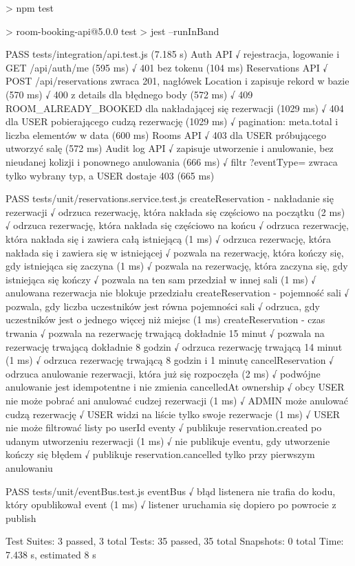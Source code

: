 \documentclass[12pt,a4paper]{article}
\begin{document}
\begin{terminal}
> npm test

> room-booking-api@5.0.0 test
> jest --runInBand

PASS tests/integration/api.test.js (7.185 s)
  Auth API
    √ rejestracja, logowanie i GET /api/auth/me (595 ms)
    √ 401 bez tokenu (104 ms)
  Reservations API
    √ POST /api/reservations zwraca 201, nagłówek Location i zapisuje rekord w bazie (570 ms)
    √ 400 z details dla błędnego body (572 ms)
    √ 409 ROOM_ALREADY_BOOKED dla nakładającej się rezerwacji (1029 ms)
    √ 404 dla USER pobierającego cudzą rezerwację (1029 ms)
    √ pagination: meta.total i liczba elementów w data (600 ms)
  Rooms API
    √ 403 dla USER próbującego utworzyć salę (572 ms)
  Audit log API
    √ zapisuje utworzenie i anulowanie, bez nieudanej kolizji i ponownego anulowania (666 ms)
    √ filtr ?eventType= zwraca tylko wybrany typ, a USER dostaje 403 (665 ms)

PASS tests/unit/reservations.service.test.js
  createReservation - nakładanie się rezerwacji
    √ odrzuca rezerwację, która nakłada się częściowo na początku (2 ms)
    √ odrzuca rezerwację, która nakłada się częściowo na końcu
    √ odrzuca rezerwację, która nakłada się i zawiera całą istniejącą (1 ms)
    √ odrzuca rezerwację, która nakłada się i zawiera się w istniejącej
    √ pozwala na rezerwację, która kończy się, gdy istniejąca się zaczyna (1 ms)
    √ pozwala na rezerwację, która zaczyna się, gdy istniejąca się kończy
    √ pozwala na ten sam przedział w innej sali (1 ms)
    √ anulowana rezerwacja nie blokuje przedziału
  createReservation - pojemność sali
    √ pozwala, gdy liczba uczestników jest równa pojemności sali
    √ odrzuca, gdy uczestników jest o jednego więcej niż miejsc (1 ms)
  createReservation - czas trwania
    √ pozwala na rezerwację trwającą dokładnie 15 minut
    √ pozwala na rezerwację trwającą dokładnie 8 godzin
    √ odrzuca rezerwację trwającą 14 minut (1 ms)
    √ odrzuca rezerwację trwającą 8 godzin i 1 minutę
  cancelReservation
    √ odrzuca anulowanie rezerwacji, która już się rozpoczęła (2 ms)
    √ podwójne anulowanie jest idempotentne i nie zmienia cancelledAt
  ownership
    √ obcy USER nie może pobrać ani anulować cudzej rezerwacji (1 ms)
    √ ADMIN może anulować cudzą rezerwację
    √ USER widzi na liście tylko swoje rezerwacje (1 ms)
    √ USER nie może filtrować listy po userId
  eventy
    √ publikuje reservation.created po udanym utworzeniu rezerwacji (1 ms)
    √ nie publikuje eventu, gdy utworzenie kończy się błędem
    √ publikuje reservation.cancelled tylko przy pierwszym anulowaniu

PASS tests/unit/eventBus.test.js
  eventBus
    √ błąd listenera nie trafia do kodu, który opublikował event (1 ms)
    √ listener uruchamia się dopiero po powrocie z publish

Test Suites: 3 passed, 3 total
Tests:       35 passed, 35 total
Snapshots:   0 total
Time:        7.438 s, estimated 8 s
\end{terminal}
\end{document}
